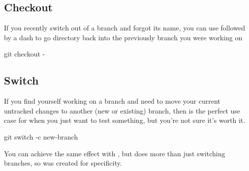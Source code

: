 \subsection{Checkout}

If you recently switch out of a branch and forgot its name, you can use  followed by a dash to go directory back into the previously branch you were working on

\begin{git-bash}
    git checkout -
\end{git-bash}



\subsection{Switch}

If you find yourself working on a branch and need to move your current untracked changes to another (new or existing) branch, then  is the perfect use case for when you just want to test something, but you're not sure it's worth it.

\begin{git-bash}
    git switch -c new-branch
\end{git-bash}

You can achieve the same effect with , but  does more than just switching branches, so  was created for specificity.






